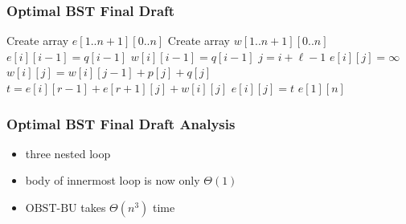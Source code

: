 \documentclass[10pt,aspectratio=169]{beamer}
\begin{document}
\begin{frame} \frametitle{Optimal BST Final Draft}
  {\tiny
  \begin{algorithmic}[1]
    \State Create array $e[1..n+1][0..n]$ 
    \State Create array $w[1..n+1][0..n]$ 
      \State $e[i][i-1] = q[i-1]$ 
      \State $w[i][i-1] = q[i-1]$
    \EndFor
        \State $j = i + \ell - 1$
        \State $e[i][j] = \infty$
        \State $w[i][j] = w[i][j-1] + p[j] + q[j]$
          \State $t = e[i][r-1] + e[r+1][j] + w[i][j]$
            \State $e[i][j] = t$
          \EndIf
        \EndFor
      \EndFor
    \EndFor
    \State \Return $e[1][n]$
    \EndFunction
  \end{algorithmic}
  }
\end{frame}

\begin{frame} \frametitle{Optimal BST Final Draft Analysis}
  \begin{itemize}
    \item three nested loop
    \item body of innermost loop is now only $\Theta(1)$
    \item $\text{OBST-BU}$ takes $\Theta(n^3)$ time
  \end{itemize}
\end{frame}
\end{document}
